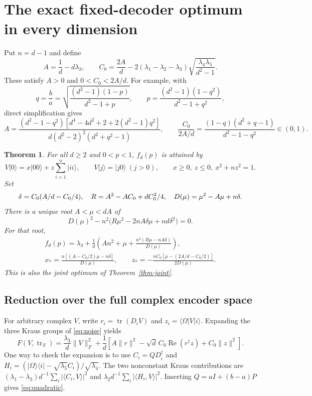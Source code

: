 \documentclass[11pt]{article}
\newcommand{\tr}{\operatorname{tr}}
\newcommand{\ket}[1]{\lvert#1\rangle}
\newcommand{\bra}[1]{\langle#1\rvert}
\newcommand{\norm}[1]{\lVert#1\rVert}
\newtheorem{theorem}{Theorem}
\begin{document}
\section{The exact fixed-decoder optimum in every dimension}
Put $n=d-1$ and define
\begin{equation}\label{eq:AC}
 A=\frac1d-d\lambda_3,\qquad
 C_0=\frac{2A}{d}-2(\lambda_1-\lambda_2-\lambda_3)
 \sqrt{\frac{\lambda_4\lambda_5}{d^2-1}}.
\end{equation}
These satisfy $A>0$ and $0<C_0<2A/d$. For example, with
\begin{equation}\label{eq:q}
 q=\frac ba=\sqrt{\frac{(d^2-1)(1-p)}{d^2-1+p}},\qquad
 p=\frac{(d^2-1)(1-q^2)}{d^2-1+q^2},
\end{equation}
direct simplification gives
\[
 A=\frac{(d^2-1-q^2)[d^4-4d^2+2+2(d^2-1)q^2]}
 {d(d^2-2)^2(d^2+q^2-1)},\qquad
 \frac{C_0}{2A/d}=\frac{(1-q)(d^2+q-1)}{d^2-1-q^2}\in(0,1).
\]

\begin{theorem}\label{thm:fixed}
For all $d\ge2$ and $0<p<1$, $f_d(p)$ is attained by
\begin{equation}\label{eq:family}
 V\ket0=x\ket{00}+z\sum_{i=1}^n\ket{ii},\qquad
 V\ket j=\ket{j0}\ (j>0),\qquad x\ge0,\ z\le0,\ x^2+nz^2=1.
\end{equation}
Set
\begin{gather}
 \delta=C_0(A/d-C_0/4),\quad R=A^2-AC_0+dC_0^2/4,\quad
 D(\mu)=\mu^2-A\mu+n\delta.\notag
\end{gather}
There is a unique root $A<\mu<dA$ of
\begin{equation}\label{eq:quartic}
 D(\mu)^2-n^2\bigl(R\mu^2-2nA\delta\mu+nd\delta^2\bigr)=0.
\end{equation}
For that root,
\begin{gather}
 f_d(p)=\lambda_3+\frac1d\left(An^2+\mu+
 \frac{n^2(R\mu-nA\delta)}{D(\mu)}\right),\label{eq:answer}\\
 x_* =\frac{n[(A-C_0/2)\mu-n\delta]}{D(\mu)},\qquad
 z_*=-\frac{nC_0[\mu-(2A/d-C_0/2)]}{2D(\mu)}.\label{eq:optimizer}
\end{gather}
This is also the joint optimum of Theorem~\ref{thm:joint}.
\end{theorem}

\subsection{Reduction over the full complex encoder space}
For arbitrary complex $V$, write
$r_i=\tr(D_iV)$ and $z_i=\bra\Omega V\ket i$.
Expanding the three Kraus groups of \eqref{eq:noise} yields
\begin{equation}\label{eq:quadratic}
 F(V,\tr_S)=\frac{\lambda_3}{d}\norm V_F^2+
 \frac1d\left[A\norm r^2-\sqrt d\,C_0\operatorname{Re}(r^\dagger z)
 +C_0\norm z^2\right].
\end{equation}
One way to check the expansion is to use
$C_i=QD_i^\dagger$ and
$H_i=(\ket\Omega\bra i-\sqrt{\lambda_5}C_i)/\sqrt{\lambda_4}$.
The two nonconstant Kraus contributions are
$(\lambda_1-\lambda_3)d^{-1}\sum_i|\langle C_i,V\rangle|^2$
and $\lambda_2d^{-1}\sum_i|\langle H_i,V\rangle|^2$.
Inserting $Q=aI+(b-a)P$ gives \eqref{eq:quadratic}.
\end{document}
